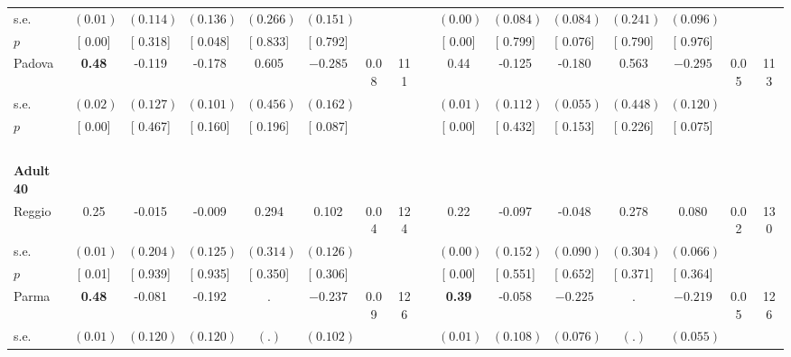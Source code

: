 \begin{longtable}{L{8em} c c c c c c c p{1em} c c c c c c c}
\quad \quad \quad \quad s.e.& $ (     0.01)$ & $ (    0.114)$ & $ (    0.136)$ & $ (    0.266)$ & $ (    0.151)$ & & & & $ (     0.00)$ & $ (    0.084)$ & $ (    0.084)$ & $ (    0.241)$ & $ (    0.096)$ & &  \\*
\quad \quad \quad \quad $ p$ & [     0.00] & [    0.318] & [    0.048] & [    0.833] & [    0.792] & & & & [     0.00] & [    0.799] & [    0.076] & [    0.790] & [    0.976] & &  \\[1em]
\quad \quad \quad Padova& \textbf{     0.48} &    -0.119 &    -0.178 &     0.605 & $ \mathbf{   -0.285}$ &      0.08 &       111 & & 0.44 &    -0.125 &    -0.180 &     0.563 & $ \mathbf{   -0.295}$ &      0.05 &       113  \\*
\quad \quad \quad \quad s.e.& $ (     0.02)$ & $ (    0.127)$ & $ (    0.101)$ & $ (    0.456)$ & $ (    0.162)$ & & & & $ (     0.01)$ & $ (    0.112)$ & $ (    0.055)$ & $ (    0.448)$ & $ (    0.120)$ & &  \\*
\quad \quad \quad \quad $ p$ & [     0.00] & [    0.467] & [    0.160] & [    0.196] & [    0.087] & & & & [     0.00] & [    0.432] & [    0.153] & [    0.226] & [    0.075] & &  \\[1em]
~\\[1em]
\quad \quad \textbf{Adult 40} & & & & & & & & & & & & & & & \\* 
\quad \quad \quad Reggio& 0.25 &    -0.015 &    -0.009 &     0.294 &     0.102 &      0.04 &       124 & & 0.22 &    -0.097 &    -0.048 &     0.278 &     0.080 &      0.02 &       130  \\*
\quad \quad \quad \quad s.e.& $ (     0.01)$ & $ (    0.204)$ & $ (    0.125)$ & $ (    0.314)$ & $ (    0.126)$ & & & & $ (     0.00)$ & $ (    0.152)$ & $ (    0.090)$ & $ (    0.304)$ & $ (    0.066)$ & &  \\*
\quad \quad \quad \quad $ p$ & [     0.01] & [    0.939] & [    0.935] & [    0.350] & [    0.306] & & & & [     0.00] & [    0.551] & [    0.652] & [    0.371] & [    0.364] & &  \\[1em]
\quad \quad \quad Parma& \textbf{     0.48} &    -0.081 &    -0.192 &         . & $ \mathbf{   -0.237}$ &      0.09 &       126 & & \textbf{     0.39} &    -0.058 & $ \mathbf{   -0.225}$ &         . & $ \mathbf{   -0.219}$ &      0.05 &       126  \\*
\quad \quad \quad \quad s.e.& $ (     0.01)$ & $ (    0.120)$ & $ (    0.120)$ & $ (        .)$ & $ (    0.102)$ & & & & $ (     0.01)$ & $ (    0.108)$ & $ (    0.076)$ & $ (        .)$ & $ (    0.055)$ & &  \\*

\end{longtable}
